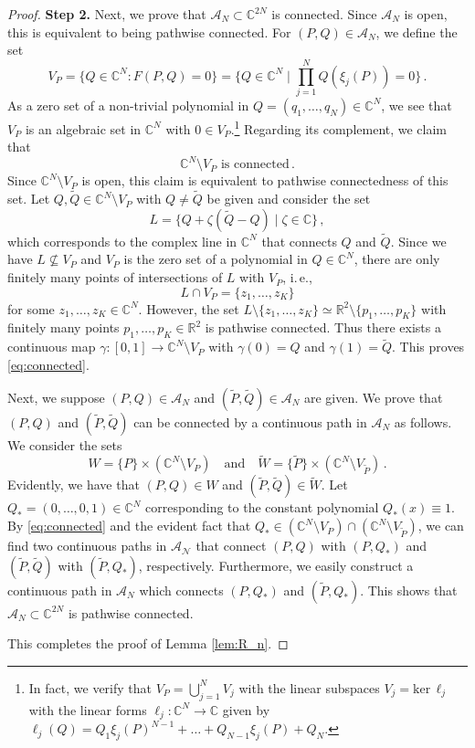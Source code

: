\documentclass[11pt,reqno]{amsart}
\theoremstyle{definition}
\theoremstyle{remark}
\theoremstyle{remark}
\numberwithin{equation}{section}
\newcommand{\C}{\mathbb{C}}
\newcommand{\R}{\mathbb{R}}
\renewcommand{\ker}{\mathrm{ker}}
\newcommand{\be}{\begin{equation}}
\newcommand{\ee}{\end{equation}}
\begin{document}
\begin{proof}
\medskip
\textbf{Step 2.} Next, we prove that $\mathcal{A}_N \subset \C^{2N}$ is connected. Since $\mathcal{A}_N$ is open, this is equivalent to being pathwise connected. For $(P,Q) \in \mathcal{A}_N$, we define the set
$$
V_P = \{ Q \in \C^N : F(P,Q)=0 \} = \{ Q \in \C^N \mid \prod_{j=1}^N Q(\xi_j(P))=0 \} \, .
$$
As a zero set of a non-trivial polynomial in $Q=(q_1, \ldots, q_N) \in \C^N$, we see that $V_P$ is an algebraic set in $\C^N$ with $0 \in V_P$.\footnote{In fact, we verify that $V_P= \bigcup_{j=1}^N V_j$ with the linear subspaces $V_j = \ker  \, \ell_j$ with the linear forms $\ell_j : \C^N \to \C$ given by $\ell_j(Q) = Q_1 \xi_j(P)^{N-1} + \ldots + Q_{N-1} \xi_j(P) + Q_N$.} Regarding its complement, we claim that 
\be \label{eq:connected}
\mbox{$\C^N \setminus V_P$ is connected} \, .
\ee
Since $\C^N \setminus V_P$ is open, this claim is equivalent to pathwise connectedness of this set. Let $Q, \tilde{Q} \in \C^N \setminus V_P$ with $Q \neq \tilde{Q}$ be given and consider the set
$$
L = \{ Q + \zeta (\tilde{Q}-Q) \mid \zeta \in \C \} \, ,
$$ 
which corresponds to the complex line in $\C^N$ that  connects $Q$ and $\tilde{Q}$. Since we have $L \not \subseteq V_P$ and $V_P$ is the zero set of a polynomial in $Q \in \C^N$, there are only finitely many points of intersections of $L$ with $V_P$, i.\,e., 
$$
L \cap V_P = \{ z_1, \ldots, z_K \}
$$ 
for some $z_1, \ldots, z_K \in \C^N$. However, the set $L \setminus \{ z_1, \ldots, z_K \} \simeq \R^2 \setminus \{ p_1, \ldots, p_K \}$ with finitely many points $p_1, \ldots, p_K \in \R^2$ is pathwise connected. Thus there exists a continuous map $\gamma: [0,1] \to \C^N \setminus V_P$ with $\gamma(0)= Q$ and $\gamma(1) = \tilde{Q}$. This proves \eqref{eq:connected}.

Next, we suppose  $(P, Q) \in \mathcal{A}_N$ and $(\tilde{P}, \tilde{Q}) \in \mathcal{A}_N$  are given. We prove that $(P,Q)$ and $(\tilde{P}, \tilde{Q})$ can be connected by a continuous path in $\mathcal{A}_N$ as follows. We consider the sets 
$$
W = \{ P \} \times (\C^N \setminus V_P) \quad  \mbox{and}  \quad \tilde{W} = \{\tilde{P} \} \times (\C^N \setminus V_{\tilde{P}}) \, . 
$$
Evidently, we have that $(P,Q) \in W$ and $(\tilde{P}, \tilde{Q}) \in \tilde{W}$. Let $Q_*=(0, \ldots, 0, 1) \in \C^N$ corresponding to the constant polynomial $Q_*(x) \equiv 1$. By \eqref{eq:connected} and the evident fact that $Q_* \in (\C^N \setminus V_P) \cap (\C^N \setminus V_{\tilde{P}})$, we can find two continuous paths in $\mathcal{A_N}$ that connect $(P,Q)$ with $(P, Q_*)$ and $(\tilde{P}, \tilde{Q})$ with $(\tilde{P}, Q_*)$, respectively. Furthermore, we easily construct a continuous path in $\mathcal{A}_N$ which connects $(P,Q_*)$ and $(\tilde{P},Q_*)$. This shows that $\mathcal{A}_N \subset \C^{2N}$ is pathwise connected.

This completes the proof of Lemma \ref{lem:R_n}.
\end{proof}
\end{document}
